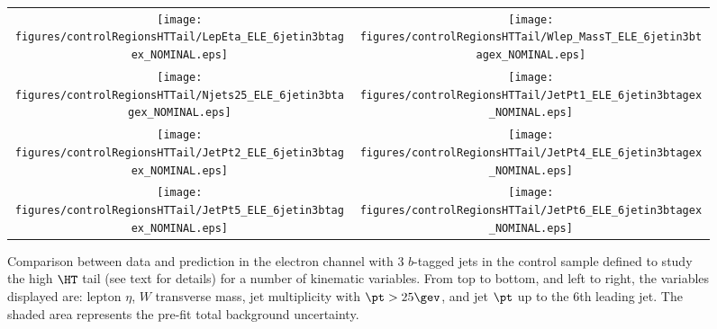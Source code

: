 \begin{figure}[htbp]
\begin{center}
\begin{tabular}{cc}
%
\texttt{[image: figures/controlRegionsHTTail/LepEta\_ELE\_6jetin3btagex\_NOMINAL.eps]} &
\texttt{[image: figures/controlRegionsHTTail/Wlep\_MassT\_ELE\_6jetin3btagex\_NOMINAL.eps]} \\
\texttt{[image: figures/controlRegionsHTTail/Njets25\_ELE\_6jetin3btagex\_NOMINAL.eps]} &
\texttt{[image: figures/controlRegionsHTTail/JetPt1\_ELE\_6jetin3btagex\_NOMINAL.eps]} \\
\texttt{[image: figures/controlRegionsHTTail/JetPt2\_ELE\_6jetin3btagex\_NOMINAL.eps]} &
\texttt{[image: figures/controlRegionsHTTail/JetPt4\_ELE\_6jetin3btagex\_NOMINAL.eps]} \\
\texttt{[image: figures/controlRegionsHTTail/JetPt5\_ELE\_6jetin3btagex\_NOMINAL.eps]} &
\texttt{[image: figures/controlRegionsHTTail/JetPt6\_ELE\_6jetin3btagex\_NOMINAL.eps]} \\
\end{tabular}\caption{\small {Comparison between data and prediction in the electron channel with 3 $b$-tagged jets in the control sample
defined to study the high $\HT$ tail (see text for details)  for a number of kinematic
variables. From top to bottom, and left to right, the variables displayed are: lepton $\eta$, $W$ transverse mass, jet multiplicity with $\pt>25\gev$, 
and jet $\pt$ up to the 6th leading jet.
The shaded area represents the pre-fit total background uncertainty.}}
\label{fig:ELE_controlHTTail_3btagex_2}
\end{center}
\end{figure}
